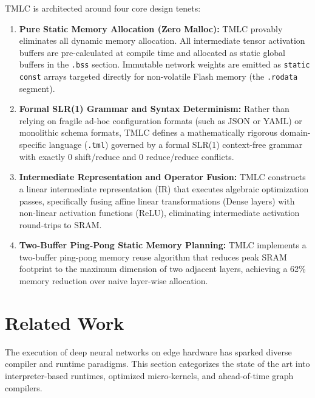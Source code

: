 \documentclass[11pt,a4paper]{article}
\begin{document}
TMLC is architected around four core design tenets:
\begin{enumerate}[leftmargin=*]
    \item \textbf{Pure Static Memory Allocation (Zero Malloc):} TMLC provably eliminates all dynamic memory allocation. All intermediate tensor activation buffers are pre-calculated at compile time and allocated as static global buffers in the \texttt{.bss} section. Immutable network weights are emitted as \texttt{static const} arrays targeted directly for non-volatile Flash memory (the \texttt{.rodata} segment).
    \item \textbf{Formal SLR(1) Grammar and Syntax Determinism:} Rather than relying on fragile ad-hoc configuration formats (such as JSON or YAML) or monolithic schema formats, TMLC defines a mathematically rigorous domain-specific language (\texttt{.tml}) governed by a formal SLR(1) context-free grammar with exactly 0 shift/reduce and 0 reduce/reduce conflicts.
    \item \textbf{Intermediate Representation and Operator Fusion:} TMLC constructs a linear intermediate representation (IR) that executes algebraic optimization passes, specifically fusing affine linear transformations (Dense layers) with non-linear activation functions (ReLU), eliminating intermediate activation round-trips to SRAM.
    \item \textbf{Two-Buffer Ping-Pong Static Memory Planning:} TMLC implements a two-buffer ping-pong memory reuse algorithm that reduces peak SRAM footprint to the maximum dimension of two adjacent layers, achieving a 62\% memory reduction over naive layer-wise allocation.
\end{enumerate}

\section{Related Work}
\label{sec:related_work}

The execution of deep neural networks on edge hardware has sparked diverse compiler and runtime paradigms. This section categorizes the state of the art into interpreter-based runtimes, optimized micro-kernels, and ahead-of-time graph compilers.
\end{document}
